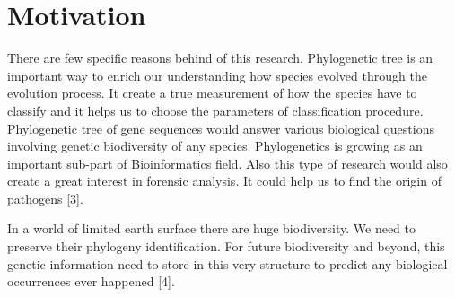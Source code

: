 \documentclass[preprint,12pt]{elsarticle}
\begin{document}








\section{Motivation}
There are few specific reasons behind of this research. Phylogenetic tree is an important way to enrich our understanding how species evolved through the evolution process. It create a true measurement of how the species have to classify and it helps us to choose the parameters of classification procedure. Phylogenetic tree of gene sequences would answer various biological questions involving genetic biodiversity of any species. Phylogenetics is growing as an important sub-part of Bioinformatics field. Also this type of research would also create a great interest in forensic analysis. It could help us to find the origin of pathogens [3].


In a world of limited earth surface there are huge biodiversity. We need to preserve their phylogeny identification. For future biodiversity and beyond, this genetic information need to store in this very structure to predict any biological occurrences ever happened [4].
\end{document}
